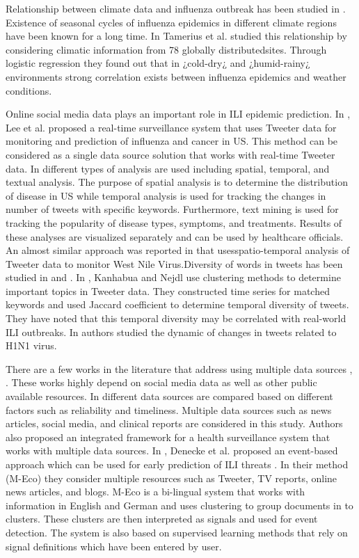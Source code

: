 Relationship between climate data and influenza outbreak has been
studied in \cite{ref9}. Existence of seasonal cycles of influenza
epidemics in different climate regions have been known for a long time.
In \cite{ref9} Tamerius et al. studied this relationship by considering
climatic information from 78 globally distributedsites. Through logistic
regression they found out that in ¿cold-dry¿ and ¿humid-rainy¿
environments strong correlation exists between influenza epidemics and
weather conditions.

Online social media data plays an important role in ILI epidemic
prediction. In \cite{ref4}, Lee et al. proposed a real-time surveillance
system that uses Tweeter data for monitoring and prediction of influenza
and cancer in US. This method can be considered as a single data source
solution that works with real-time Tweeter data. In \cite{ref4}
different types of analysis are used including spatial, temporal, and
textual analysis. The purpose of spatial analysis is to determine the
distribution of disease in US while temporal analysis is used for
tracking the changes in number of tweets with specific keywords.
Furthermore, text mining is used for tracking the popularity of disease
types, symptoms, and treatments. Results of these analyses are
visualized separately and can be used by healthcare officials. An almost
similar approach was reported in \cite{ref7} that usesspatio-temporal
analysis of Tweeter data to monitor West Nile Virus.Diversity of words
in tweets has been studied in \cite{ref5} and \cite{ref6} . In
\cite{ref5}, Kanhabua and Nejdl use clustering methods to determine
important topics in Tweeter data. They constructed time series for
matched keywords and used Jaccard coefficient to determine temporal
diversity of tweets. They have noted that this temporal diversity may be
correlated with real-world ILI outbreaks. In \cite{ref6} authors studied
the dynamic of changes in tweets related to H1N1 virus.

There are a few works in the literature that address using multiple data
sources \cite{ref10}, \cite{ref3}. These works highly depend on social
media data as well as other public available resources. In \cite{ref10}
different data sources are compared based on different factors such as
reliability and timeliness. Multiple data sources such as news articles,
social media, and clinical reports are considered in this study. Authors
also proposed an integrated framework for a health surveillance system
that works with multiple data sources. In \cite{ref3}, Denecke et al.
proposed an event-based approach which can be used for early prediction
of ILI threats \cite{ref3}. In their method (M-Eco) they consider
multiple resources such as Tweeter, TV reports, online news articles,
and blogs. M-Eco is a bi-lingual system that works with information in
English and German and uses clustering to group documents in to
clusters. These clusters are then interpreted as signals and used for
event detection. The system is also based on supervised learning methods
that rely on signal definitions which have been entered by user.

